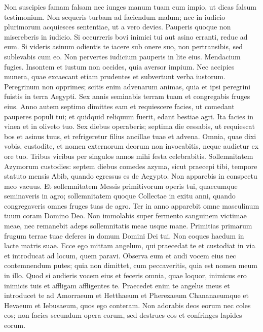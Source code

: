 \begin{biblechapter}  
\verse Non suscipies famam falsam nec iunges manum tuam cum impio, ut dicas falsum testimonium. 
\verse Non sequeris turbam ad faciendum malum; nec in iudicio plurimorum acquiesces sententiae, ut a vero devies. 
\verse Pauperis quoque non misereberis in iudicio. 
\verse Si occurreris bovi inimici tui aut asino erranti, reduc ad eum. 
\verse Si videris asinum odientis te iacere sub onere suo, non pertransibis, sed sublevabis cum eo. 
\verse Non pervertes iudicium pauperis in lite eius. 
\verse Mendacium fugies. Insontem et iustum non occides, quia aversor impium. 
\verse Nec accipies munera, quae excaecant etiam prudentes et subvertunt verba iustorum. 
\verse Peregrinum non opprimes; scitis enim advenarum animas, quia et ipsi peregrini fuistis in terra Aegypti. 
\verse Sex annis seminabis terram tuam et congregabis fruges eius. 
\verse Anno autem septimo dimittes eam et requiescere facies, ut comedant pauperes populi tui; et quidquid reliquum fuerit, edant bestiae agri. Ita facies in vinea et in oliveto tuo. 
\verse Sex diebus operaberis; septima die cessabis, ut requiescat bos et asinus tuus, et refrigeretur filius ancillae tuae et advena. 
\verse Omnia, quae dixi vobis, custodite, et nomen externorum deorum non invocabitis, neque audietur ex ore tuo. 
\verse Tribus vicibus per singulos annos mihi festa celebrabitis. 
\verse Sollemnitatem Azymorum custodies: septem diebus comedes azyma, sicut praecepi tibi, tempore statuto mensis Abib, quando egressus es de Aegypto. Non apparebis in conspectu meo vacuus. 
\verse Et sollemnitatem Messis primitivorum operis tui, quaecumque seminaveris in agro; sollemnitatem quoque Collectae in exitu anni, quando congregaveris omnes fruges tuas de agro. 
\verse Ter in anno apparebit omne masculinum tuum coram Domino Deo. 
\verse Non immolabis super fermento sanguinem victimae meae, nec remanebit adeps sollemnitatis meae usque mane. 
\verse Primitias primarum frugum terrae tuae deferes in domum Domini Dei tui. Non coques haedum in lacte matris suae. 
\verse Ecce ego mittam angelum, qui praecedat te et custodiat in via et introducat ad locum, quem paravi. 
\verse Observa eum et audi vocem eius nec contemnendum putes; quia non dimittet, cum peccaveritis, quia est nomen meum in illo. 
\verse Quod si audieris vocem eius et feceris omnia, quae loquor, inimicus ero inimicis tuis et affligam affligentes te. 
\verse Praecedet enim te angelus meus et introducet te ad Amorraeum et Hetthaeum et Pherezaeum Chananaeumque et Hevaeum et Iebusaeum, quos ego conteram. 
\verse Non adorabis deos eorum nec coles eos; non facies secundum opera eorum, sed destrues eos et confringes lapides eorum. 

\end{biblechapter}
